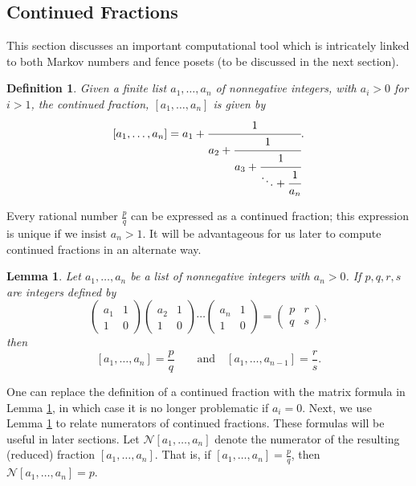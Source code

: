 \documentclass[12pt, letterpaper,table]{amsart}
\newtheorem{definition}[theorem]{Definition}
\newtheorem{lemma}[theorem]{Lemma}
\theoremstyle{remark}
\newcommand{\fpq}{\frac{p}{q}}
\newcommand{\frs}{\frac{r}{s}}
\begin{document}
\subsection{Continued Fractions}

This section discusses an important computational tool which is intricately linked to both Markov numbers and fence posets (to be discussed in the next section).

\begin{definition}
Given a finite list $a_1,\ldots,a_n$ of nonnegative integers, with $a_i > 0$ for $i > 1$,  the \emph{continued fraction}, $[a_1,\ldots,a_n]$ is given by \[
[a_1,\ldots,a_n] = a_1 + \cfrac{1}{a_2 + \cfrac{1}{a_3 + \cfrac{1}{\ddots + \cfrac{1}{a_n}}}}.
\]
\end{definition}

Every rational number $\fpq$ can be expressed as a continued fraction; this expression is unique if we insist $a_n > 1$. It will be advantageous for us later to compute continued fractions in an alternate way.

\begin{lemma}\label{lem:ComputeWithMatrix}
Let $a_1,\ldots,a_n$ be a list of nonnegative integers with $a_n > 0$. If $p,q,r,s$ are integers defined by \[
\begin{pmatrix} a_1 & 1 \\ 1 & 0 \end{pmatrix} \begin{pmatrix} a_2 & 1 \\ 1 & 0 \end{pmatrix} \cdots \begin{pmatrix} a_n & 1 \\ 1 & 0 \end{pmatrix} = \begin{pmatrix} p & r\\ q & s\end{pmatrix},
\]
then \[
[a_1,\ldots,a_n] = \fpq \qquad \text{and} \quad [a_1,\ldots,a_{n-1}] = \frs.
\]
\end{lemma}

One can replace the definition of a continued fraction with the matrix formula in Lemma \ref{lem:ComputeWithMatrix}, in which case it is no longer problematic if $a_i = 0$. Next, we use Lemma \ref{lem:ComputeWithMatrix} to relate numerators of continued fractions. These formulas will be useful in later sections. Let $\mathcal{N}[a_1,\ldots,a_n]$ denote the numerator of the resulting (reduced) fraction $[a_1,\ldots,a_n]$. That is, if $[a_1,\ldots,a_n] = \fpq$, then $\mathcal{N}[a_1,\ldots,a_n] = p$.  
\end{document}
